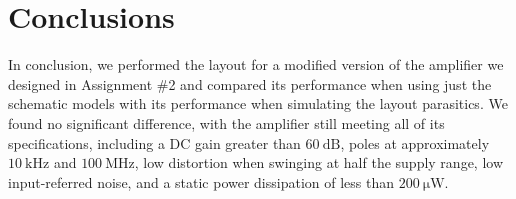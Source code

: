 \documentclass[journal,hidelinks]{IEEEtran}
\begin{document}
\section{Conclusions}

In conclusion, we performed the layout for a modified version of the amplifier we designed in Assignment \#2 and compared its performance when using just the schematic models with its performance when simulating the layout parasitics. We found no significant difference, with the amplifier still meeting all of its specifications, including a DC gain greater than $\SI{60}{\deci\bel}$, poles at approximately $\SI{10}{\kilo\hertz}$ and $\SI{100}{\mega\hertz}$, low distortion when swinging at half the supply range, low input-referred noise, and a static power dissipation of less than $\SI{200}{\micro\watt}$.



\end{document}
